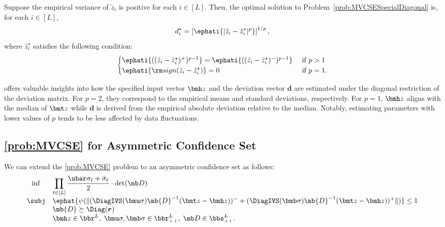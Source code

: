 \documentclass[opre, blindrev]{informs4}
\newcommand{\1}[1]{\mathds{1}{\left(#1\right)}}
\begin{document}
\begin{theorem}
\label{chap8:thm:MinimumVolumeSpecialDiagonal}
Suppose the empirical variance of $\tilde z_i$ is positive for each $i \in [L]$. Then, the optimal solution to Problem~\eqref{prob:MVCSESpecialDiagonal} is, for each $i \in [L]$,  
$$
d^\star_i = \left[\ephati{|\tilde z_i - \hat z^\star_i|^p}\right]^{1/p},
$$
where $\hat z^\star_i$ satisfies the following condition:
$$
\begin{cases}
\ephati{((\tilde z_i - \hat z^\star_i)^{+})^{p-1}} = \ephati{((\tilde z_i - \hat z^\star_i)^{-})^{p-1}} &~\text{if}~ p > 1 \\
\ephati{{\rm sign}(\tilde z_i - \hat z^\star_i)} = 0 &~\text{if}~ p = 1.
\end{cases}
$$
\end{theorem}

 offers valuable insights into how the specified input vector $\bmh z$ and the deviation vector $\bm d$ are estimated under the diagonal restriction of the deviation matrix. For $p=2$, they correspond to the empirical means and standard deviations, respectively. For $p=1$, $\bmh z$ aligns with the median of $\bmt z$ while $\bm d$ is derived from the empirical absolute deviation relative to the median. Notably, estimating parameters with lower values of $p$ tends to be less affected by data fluctuations.

\subsection*{\ref{prob:MVCSE} for Asymmetric Confidence Set}
\label{sec:MVCSE_Asymmetric_Region}
We can extend the \ref{prob:MVCSE} problem to an asymmetric confidence set as follows:
\begin{equation}
\label{prob:MVCSEAsymmetricRegionEstimation}
\begin{array}{cll}
\inf & \displaystyle \prod_{\ell \in [L]} \frac{\ubar \sigma_{\ell} + \bar \sigma_{\ell}}{2} \cdot \det(\mb D) \\
\subj & \displaystyle\ephat{\psi(\|(\DiagIVS(\bmu \sigma) \mb{D}^{-1} (\bmt z - \bmh z))^- + (\DiagIVS(\bmb \sigma) \mb{D}^{-1} (\bmt z - \bmh z ))^+\|)} \leq 1 \\
& \mb{D} \succeq \Diag(\bm r) \\
& \bmh z \in \bbr^L, \; \bmu \sigma,\bmb \sigma \in \bbr^L_{++}, \; \mb D \in \bbs^L_{++}.  
\end{array} 
\end{equation}
\end{document}
